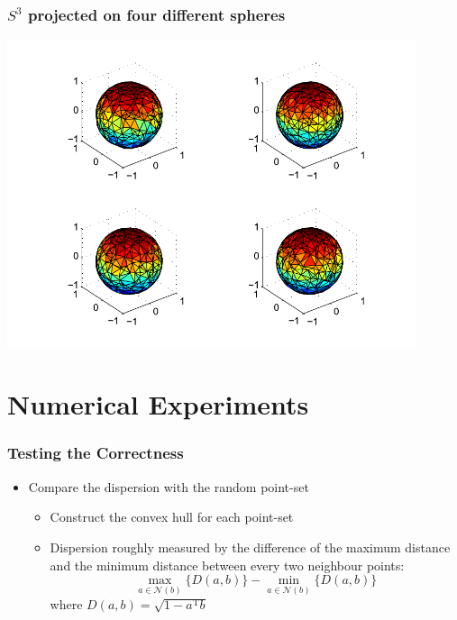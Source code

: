 \documentclass[serif]{beamer} %
\begin{document}
\begin{frame}
  \frametitle{$S^3$ projected on four different spheres}
  \centerline{\includegraphics[width=0.9\textwidth]{res_proj.pdf}}
\end{frame}



\section{Numerical Experiments}

\begin{frame}
  \frametitle{Testing the Correctness}
  \begin{itemize}
    \item Compare the dispersion with the random point-set
    \begin{itemize}
      \item Construct the convex hull for each point-set
      \item Dispersion roughly measured by the difference of the maximum distance and the minimum distance between every two neighbour points: 
\[
      \max_{a \in \mathcal{N}(b)} \{D(a,b)\} - 
        \min_{a \in \mathcal{N}(b)} \{ D(a, b) \}  
\]
      where $D(a,b) = \sqrt{1 - a^\mathrm{T} b}$
    \end{itemize}
  \end{itemize}
\end{frame}
\end{document}
